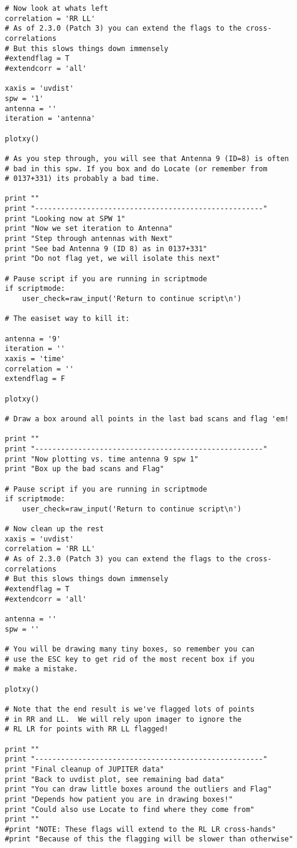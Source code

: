 \begin{verbatim}
# Now look at whats left
correlation = 'RR LL'
# As of 2.3.0 (Patch 3) you can extend the flags to the cross-correlations
# But this slows things down immensely
#extendflag = T
#extendcorr = 'all'

xaxis = 'uvdist'
spw = '1'
antenna = ''
iteration = 'antenna'

plotxy()

# As you step through, you will see that Antenna 9 (ID=8) is often 
# bad in this spw. If you box and do Locate (or remember from
# 0137+331) its probably a bad time.

print ""
print "-----------------------------------------------------"
print "Looking now at SPW 1"
print "Now we set iteration to Antenna"
print "Step through antennas with Next"
print "See bad Antenna 9 (ID 8) as in 0137+331"
print "Do not flag yet, we will isolate this next"

# Pause script if you are running in scriptmode
if scriptmode:
    user_check=raw_input('Return to continue script\n')

# The easiset way to kill it:

antenna = '9'
iteration = ''
xaxis = 'time'
correlation = ''
extendflag = F

plotxy()

# Draw a box around all points in the last bad scans and flag 'em!

print ""
print "-----------------------------------------------------"
print "Now plotting vs. time antenna 9 spw 1"
print "Box up the bad scans and Flag"

# Pause script if you are running in scriptmode
if scriptmode:
    user_check=raw_input('Return to continue script\n')

# Now clean up the rest
xaxis = 'uvdist'
correlation = 'RR LL'
# As of 2.3.0 (Patch 3) you can extend the flags to the cross-correlations
# But this slows things down immensely
#extendflag = T
#extendcorr = 'all'

antenna = ''
spw = ''

# You will be drawing many tiny boxes, so remember you can
# use the ESC key to get rid of the most recent box if you
# make a mistake.

plotxy()

# Note that the end result is we've flagged lots of points
# in RR and LL.  We will rely upon imager to ignore the
# RL LR for points with RR LL flagged!

print ""
print "-----------------------------------------------------"
print "Final cleanup of JUPITER data"
print "Back to uvdist plot, see remaining bad data"
print "You can draw little boxes around the outliers and Flag"
print "Depends how patient you are in drawing boxes!"
print "Could also use Locate to find where they come from"
print ""
#print "NOTE: These flags will extend to the RL LR cross-hands"
#print "Because of this the flagging will be slower than otherwise"


\end{verbatim}
